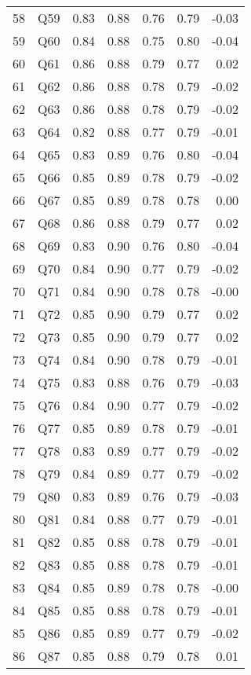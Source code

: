 \documentclass{amsart}
\begin{document}
\begin{longtable}{rlrrrrr}
  58 & Q59 & 0.83 & 0.88 & 0.76 & 0.79 & -0.03 \\ 
  59 & Q60 & 0.84 & 0.88 & 0.75 & 0.80 & -0.04 \\ 
  60 & Q61 & 0.86 & 0.88 & 0.79 & 0.77 & 0.02 \\ 
  61 & Q62 & 0.86 & 0.88 & 0.78 & 0.79 & -0.02 \\ 
  62 & Q63 & 0.86 & 0.88 & 0.78 & 0.79 & -0.02 \\ 
  63 & Q64 & 0.82 & 0.88 & 0.77 & 0.79 & -0.01 \\ 
  64 & Q65 & 0.83 & 0.89 & 0.76 & 0.80 & -0.04 \\ 
  65 & Q66 & 0.85 & 0.89 & 0.78 & 0.79 & -0.02 \\ 
  66 & Q67 & 0.85 & 0.89 & 0.78 & 0.78 & 0.00 \\ 
  67 & Q68 & 0.86 & 0.88 & 0.79 & 0.77 & 0.02 \\ 
  68 & Q69 & 0.83 & 0.90 & 0.76 & 0.80 & -0.04 \\ 
  69 & Q70 & 0.84 & 0.90 & 0.77 & 0.79 & -0.02 \\ 
  70 & Q71 & 0.84 & 0.90 & 0.78 & 0.78 & -0.00 \\ 
  71 & Q72 & 0.85 & 0.90 & 0.79 & 0.77 & 0.02 \\ 
  72 & Q73 & 0.85 & 0.90 & 0.79 & 0.77 & 0.02 \\ 
  73 & Q74 & 0.84 & 0.90 & 0.78 & 0.79 & -0.01 \\ 
  74 & Q75 & 0.83 & 0.88 & 0.76 & 0.79 & -0.03 \\ 
  75 & Q76 & 0.84 & 0.90 & 0.77 & 0.79 & -0.02 \\ 
  76 & Q77 & 0.85 & 0.89 & 0.78 & 0.79 & -0.01 \\ 
  77 & Q78 & 0.83 & 0.89 & 0.77 & 0.79 & -0.02 \\ 
  78 & Q79 & 0.84 & 0.89 & 0.77 & 0.79 & -0.02 \\ 
  79 & Q80 & 0.83 & 0.89 & 0.76 & 0.79 & -0.03 \\ 
  80 & Q81 & 0.84 & 0.88 & 0.77 & 0.79 & -0.01 \\ 
  81 & Q82 & 0.85 & 0.88 & 0.78 & 0.79 & -0.01 \\ 
  82 & Q83 & 0.85 & 0.88 & 0.78 & 0.79 & -0.01 \\ 
  83 & Q84 & 0.85 & 0.89 & 0.78 & 0.78 & -0.00 \\ 
  84 & Q85 & 0.85 & 0.88 & 0.78 & 0.79 & -0.01 \\ 
  85 & Q86 & 0.85 & 0.89 & 0.77 & 0.79 & -0.02 \\ 
  86 & Q87 & 0.85 & 0.88 & 0.79 & 0.78 & 0.01 \\ 

\end{longtable}
\end{document}
